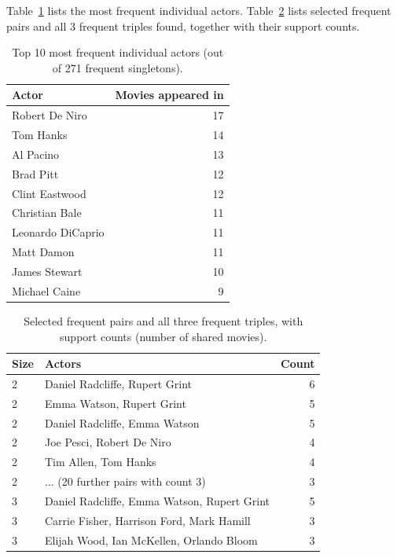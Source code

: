 \documentclass[11pt,a4paper]{article}
\begin{document}
Table~\ref{tab:top-singletons} lists the most frequent individual actors.
Table~\ref{tab:freq-pairs-triples} lists selected frequent pairs and all 3
frequent triples found, together with their support counts.

\begin{table}[h]
\centering
\caption{Top 10 most frequent individual actors (out of 271 frequent
singletons).}
\label{tab:top-singletons}
\begin{tabular}{@{}lr@{}}
\toprule
Actor & Movies appeared in \\
\midrule
Robert De Niro     & 17 \\
Tom Hanks          & 14 \\
Al Pacino          & 13 \\
Brad Pitt          & 12 \\
Clint Eastwood     & 12 \\
Christian Bale     & 11 \\
Leonardo DiCaprio  & 11 \\
Matt Damon         & 11 \\
James Stewart      & 10 \\
Michael Caine      & 9  \\
\bottomrule
\end{tabular}
\end{table}

\begin{table}[h]
\centering
\caption{Selected frequent pairs and all three frequent triples, with support
counts (number of shared movies).}
\label{tab:freq-pairs-triples}
\begin{tabular}{@{}llr@{}}
\toprule
Size & Actors & Count \\
\midrule
2 & Daniel Radcliffe, Rupert Grint & 6 \\
2 & Emma Watson, Rupert Grint & 5 \\
2 & Daniel Radcliffe, Emma Watson & 5 \\
2 & Joe Pesci, Robert De Niro & 4 \\
2 & Tim Allen, Tom Hanks & 4 \\
2 & $\ldots$ (20 further pairs with count 3) & 3 \\
\midrule
3 & Daniel Radcliffe, Emma Watson, Rupert Grint & 5 \\
3 & Carrie Fisher, Harrison Ford, Mark Hamill & 3 \\
3 & Elijah Wood, Ian McKellen, Orlando Bloom & 3 \\
\bottomrule
\end{tabular}
\end{table}
\end{document}
